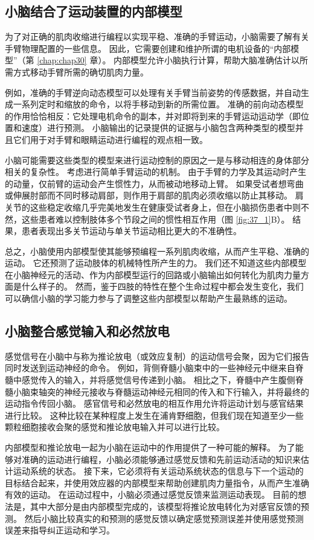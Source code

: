 \subsection{小脑结合了运动装置的内部模型}
为了对正确的肌肉收缩进行编程以实现平稳、准确的手臂运动，小脑需要了解有关手臂物理配置的一些信息。 因此，它需要创建和维护所谓的电机设备的“内部模型”（第 \ref{chap:chap30} 章）。 内部模型允许小脑执行计算，帮助大脑准确估计以所需方式移动手臂所需的确切肌肉力量。

例如，准确的手臂逆向动态模型可以处理有关手臂当前姿势的传感数据，并自动生成一系列定时和缩放的命令，以将手移动到新的所需位置。 准确的前向动态模型的作用恰恰相反：它处理电机命令的副本，并对即将到来的手臂运动运动学（即位置和速度）进行预测。 小脑输出的记录提供的证据与小脑包含两种类型的模型并且它们用于对手臂和眼睛运动进行编程的观点相一致。

小脑可能需要这些类型的模型来进行运动控制的原因之一是与移动相连的身体部分相关的复杂性。 考虑进行简单手臂运动的机制。 由于手臂的力学及其运动时产生的动量，仅前臂的运动会产生惯性力，从而被动地移动上臂。 如果受试者想弯曲或伸展肘部而不同时移动肩部，则作用于肩部的肌肉必须收缩以防止其移动。 肩关节的这些稳定收缩几乎完美地发生在健康受试者身上，但在小脑损伤患者中则不然，这些患者难以控制肢体多个节段之间的惯性相互作用（图 \ref{fig:37_1}B）。 结果，患者表现出多关节运动与单关节运动相比更大的不准确性。

总之，小脑使用内部模型使其能够预编程一系列肌肉收缩，从而产生平稳、准确的运动。 它还预测了运动肢体的机械特性所产生的力。 我们还不知道这些内部模型在小脑神经元的活动、作为内部模型运行的回路或小脑输出如何转化为肌肉力量方面是什么样子的。 然而，鉴于四肢的特性在整个生命过程中都会发生变化，我们可以确信小脑的学习能力参与了调整这些内部模型以帮助产生最熟练的运动。

\subsection{小脑整合感觉输入和必然放电}
感觉信号在小脑中与称为推论放电（或效应复制）的运动信号会聚，因为它们报告同时发送到运动神经的命令。 例如，背侧脊髓小脑束中的一些神经元中继来自脊髓中感觉传入的输入，并将感觉信号传递到小脑。 相比之下，脊髓中产生腹侧脊髓小脑束轴突的神经元接收与脊髓运动神经元相同的传入和下行输入，并将最终的运动指令传回小脑。 感官信号和必然放电的相互作用允许将运动计划与感官结果进行比较。 这种比较在某种程度上发生在浦肯野细胞，但我们现在知道至少一些颗粒细胞接收会聚的感觉和推论放电输入并可以进行比较。

内部模型和推论放电一起为小脑在运动中的作用提供了一种可能的解释。 为了能够对准确的运动进行编程，小脑必须能够通过感觉反馈和先前运动活动的知识来估计运动系统的状态。 接下来，它必须将有关运动系统状态的信息与下一个运动的目标结合起来，并使用效应器的内部模型来帮助创建肌肉力量指令，从而产生准确有效的运动。 在运动过程中，小脑必须通过感觉反馈来监测运动表现。 目前的想法是，其中大部分是由内部模型完成的，该模型将推论放电转化为对感官反馈的预测。 然后小脑比较真实的和预测的感觉反馈以确定感觉预测误差并使用感觉预测误差来指导纠正运动和学习。

